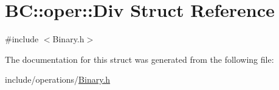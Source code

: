 \hypertarget{structBC_1_1oper_1_1Div}{}\section{BC\+:\+:oper\+:\+:Div Struct Reference}
\label{structBC_1_1oper_1_1Div}


{\ttfamily \#include $<$Binary.\+h$>$}



The documentation for this struct was generated from the following file\+:\begin{DoxyCompactItemize}
\item 
include/operations/\hyperlink{Binary_8h}{Binary.\+h}\end{DoxyCompactItemize}
